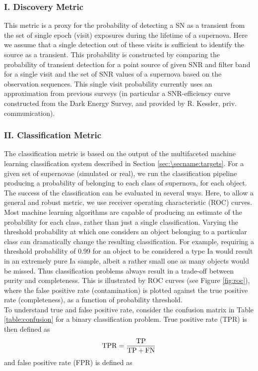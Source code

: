 \subsubsection{I. Discovery Metric}
This metric is a proxy for the probability of detecting a SN as a transient
from the set of single epoch (visit) exposures during the lifetime of a supernova. Here we
assume that a single detection out of these visits is sufficient to identify the source as
a transient. This probability is constructed by comparing the probability of transient
detection for a point source of given SNR and filter band for a single visit and the set of SNR values of a supernova based on the observation sequences. 
This single
visit probability currently uses an approximation from previous surveys (in particular a SNR-efficiency curve constructed from the Dark Energy Survey, and
provided by R. Kessler, priv. communication).

\subsubsection{II. Classification Metric}
The classification metric is based on the output of the multifaceted machine learning 
classification system described in Section \ref{sec:\secname:targets}. For a given set of supernovae 
(simulated or real), we run the classification pipeline producing a probability of belonging to 
each class of supernova, for each object. The success of the classification can be evaluated in 
several ways. Here, to allow a general and robust metric, we use receiver 
operating characteristic (ROC) curves.\\
Most machine learning algorithms are capable of producing an estimate of the probability for each 
class, rather than just a single classification. Varying the threshold probability at which one 
considers an object belonging to a particular class can dramatically change the 
resulting classification. For example, requiring a threshold probability of 0.99 for an object to 
be considered a type Ia would result in an extremely pure Ia sample, albeit a rather small one as 
many objects would be missed. Thus classification problems always result in a trade-off between 
purity and completeness. This is illustrated by ROC curves (see Figure \ref{fig:roc}), where the 
false positive rate (contamination) is plotted against the true positive rate (completeness), as a 
function of probability threshold.\\
To understand true and false positive rate, consider the confusion matrix in Table 
\ref{table:confusion} for a binary classification problem. True positive rate (TPR) is then defined 
as
\begin{equation}
 \rm{TPR} = \frac{\rm{TP}}{\rm{TP}+\rm{FN}}
\end{equation}
and false positive rate (FPR) is defined as

